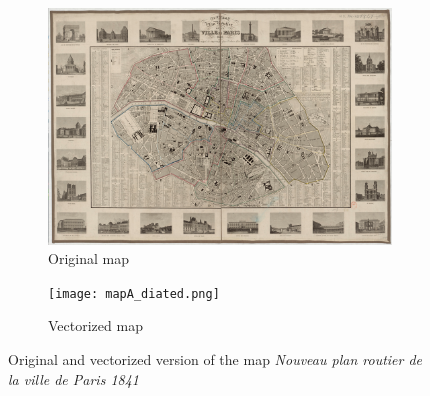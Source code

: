 \begin{figure}[h!]
     \centering
     \begin{subfigure}{0.48\textwidth}
         \centering
         \includegraphics[width=\textwidth]{Images/mapA_native_screenshot.png}
         \caption{Original map}
         \label{compare::a}
     \end{subfigure}
     \hfill
     \begin{subfigure}{0.48\textwidth}
         \centering
         \texttt{[image: mapA\_diated.png]}
         \caption{Vectorized map}
         \label{compare::b}
     \end{subfigure}
        \caption{Original and vectorized version of the map \textit{Nouveau plan routier de la ville de Paris 1841}}
        \label{compare1}
\end{figure}

